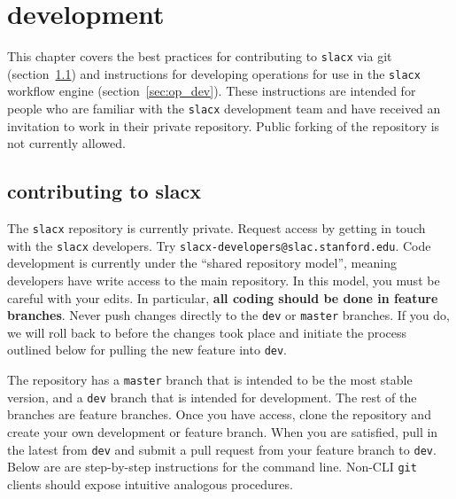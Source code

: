 \chapter{development}
\label{ch:dev}

This chapter covers the best practices 
for contributing to \verb|slacx| via git (section~\ref{sec:slacx_dev})
and instructions for developing operations
for use in the \verb|slacx| workflow engine (section~\ref{sec:op_dev}).
These instructions are intended for people
who are familiar with the \verb|slacx| development team
and have received an invitation to work in their private repository.
Public forking of the repository is not currently allowed.

\section{contributing to slacx}
\label{sec:slacx_dev}

The \verb|slacx| repository is currently private.
Request access by getting in touch with the \verb|slacx| developers.
Try \verb|slacx-developers@slac.stanford.edu|. 
Code development is currently under the ``shared repository model'',
meaning developers have write access to the main repository.
In this model, you must be careful with your edits.
In particular, \textbf{all coding should be done in feature branches}.
Never push changes directly to the \verb|dev| or \verb|master| branches.
If you do, we will roll back to before the changes took place
and initiate the process outlined below for pulling the new feature into \verb|dev|.

The repository has a \verb|master| branch that is intended to be the most stable version,
and a \verb|dev| branch that is intended for development.
The rest of the branches are feature branches.
Once you have access, clone the repository
and create your own development or feature branch.
When you are satisfied, pull in the latest from \verb|dev|
and submit a pull request from your feature branch to \verb|dev|.
Below are are step-by-step instructions for the command line.
Non-CLI \verb|git| clients should expose intuitive analogous procedures.

